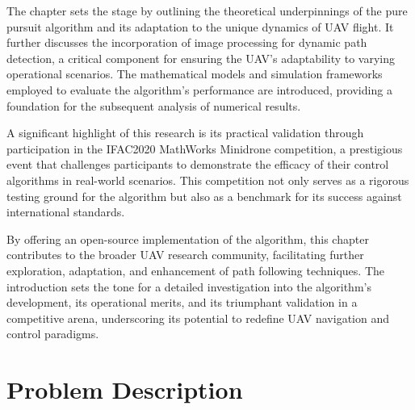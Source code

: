 The chapter sets the stage by outlining the theoretical underpinnings of the pure pursuit algorithm and its adaptation to the unique dynamics of UAV flight. It further discusses the incorporation of image processing for dynamic path detection, a critical component for ensuring the UAV's adaptability to varying operational scenarios. The mathematical models and simulation frameworks employed to evaluate the algorithm's performance are introduced, providing a foundation for the subsequent analysis of numerical results.

A significant highlight of this research is its practical validation through participation in the IFAC2020 MathWorks Minidrone competition, a prestigious event that challenges participants to demonstrate the efficacy of their control algorithms in real-world scenarios. This competition not only serves as a rigorous testing ground for the algorithm but also as a benchmark for its success against international standards.

By offering an open-source implementation of the algorithm, this chapter contributes to the broader UAV research community, facilitating further exploration, adaptation, and enhancement of path following techniques. The introduction sets the tone for a detailed investigation into the algorithm's development, its operational merits, and its triumphant validation in a competitive arena, underscoring its potential to redefine UAV navigation and control paradigms.

\newpage




\section{Problem Description}
\label{sec:problemDescription}

